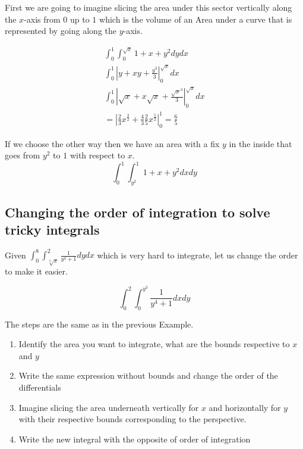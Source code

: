 First we are going to imagine slicing the area under this sector vertically along the \(x\)-axis from \(0\) up to \(1\) which
is the volume of an Area under a curve that is represented by going along the \(y\)-axis.

\begin{align*}
    \int_{0}^{1}\int_{0}^{\sqrt{x}} 1 + x + y^2 dy dx \\
    \int_{0}^{1} \left| y + xy + \frac{y^3}{3} \right|_{0}^{\sqrt{x}} dx \\
    \int_{0}^{1} \left| \sqrt{x} + x\sqrt{x} + \frac{\sqrt{x}^3}{3} \right|_{0}^{\sqrt{x}} dx \\
    = \left| \frac{2}{3} x^{\frac{3}{2}} + \frac{4}{3} \frac{2}{5} x^{\frac{5}{2}} \right|_{0}^{1} = \frac{6}{5}
\end{align*}

If we choose the other way then we have an area with a fix \(y\) in the inside that goes from \(y^2\) to \(1\) with respect to \(x\).
\[
\int_{0}^{1}\int_{y^2}^{1} 1 + x + y^2 dx dy
\]

\subsection{Changing the order of integration to solve tricky integrals}

Given \(\int_{0}^{8}\int_{\sqrt[3]{x}}^{2} \frac{1}{y^4 +1}dy dx\) which is very hard to integrate, let us change the order
to make it easier.

\[\int_{0}^{2}\int_{0}^{y^3} \frac{1}{y^4 +1}dx dy\]

The steps are the same as in the previous Example.

\begin{enumerate}
    \item Identify the area you want to integrate, what are the bounds respective to \(x\) and \(y\)
    \item Write the same expression without bounds and change the order of the differentials
    \item Imagine slicing the area underneath vertically for \(x\) and horizontally for \(y\) with their respective bounds corresponding
    to the perspective.
    \item Write the new integral with the opposite of order of integration
\end{enumerate}

